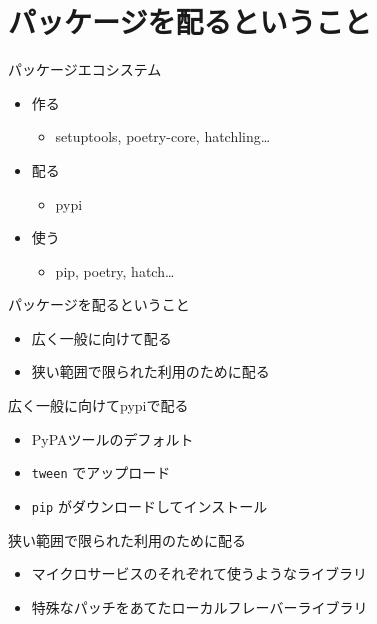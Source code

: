 \documentclass[presentation]{beamer}
\begin{document}
\section{パッケージを配るということ}
\label{sec:org426fb51}
\begin{frame}[label={sec:orgb3b18b4}]{パッケージエコシステム}
\begin{itemize}
\item 作る
\begin{itemize}
\item setuptools, poetry-core, hatchling\ldots{}
\end{itemize}
\item 配る
\begin{itemize}
\item pypi
\end{itemize}
\item 使う
\begin{itemize}
\item pip, poetry, hatch\ldots{}
\end{itemize}
\end{itemize}
\end{frame}

\begin{frame}[label={sec:orgdc165ea}]{パッケージを配るということ}
\begin{itemize}
\item 広く一般に向けて配る
\item 狭い範囲で限られた利用のために配る
\end{itemize}
\end{frame}

\begin{frame}[label={sec:orgb8266d5},fragile]{広く一般に向けてpypiで配る}
 \begin{itemize}
\item PyPAツールのデフォルト
\item \texttt{tween} でアップロード
\item \texttt{pip} がダウンロードしてインストール
\end{itemize}
\end{frame}

\begin{frame}[label={sec:orged2d339}]{狭い範囲で限られた利用のために配る}
\begin{itemize}
\item マイクロサービスのそれぞれて使うようなライブラリ
\item 特殊なパッチをあてたローカルフレーバーライブラリ
\end{itemize}
\end{frame}
\end{document}
